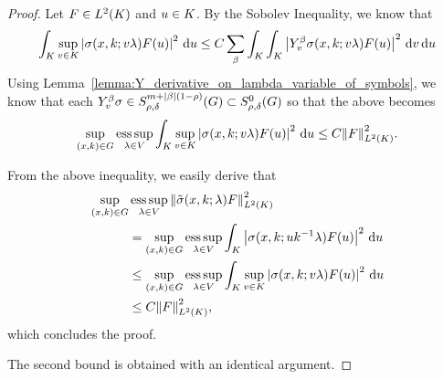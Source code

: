 \begin{proof}
    Let $F \in \Lebesgue 2 \CompactGroup$ and $u \in \CompactGroup$.
    By the Sobolev Inequality,
    we know that
    \begin{align*}
        \int_\CompactGroup \sup_{v \in \CompactGroup} \abs {\sigma(x, k; v \lambda) F(u)}^2 \dd u
        \leq C \sum_{\beta} \int_\CompactGroup \int_\CompactGroup \abs{Y^\beta_v \sigma(x, k; v \lambda) F(u)}^2 \dd v \dd u
    \end{align*}
    Using Lemma~\ref{lemma:Y_derivative_on_lambda_variable_of_symbols},
    we know that each $Y^\beta_v \sigma \in \SymbolClass {m + \abs \beta (1 - \rho)} {\rho, \delta} \subset \SymbolClass 0 {\rho, \delta}$ so that the above becomes
    \begin{align*}
        \sup_{(x, k) \in \Group} \esssup_{\lambda \in \VectorSpace}
        \int_\CompactGroup \sup_{v \in \CompactGroup} \abs {\sigma(x, k; v \lambda) F(u)}^2 \dd u
        \leq C \norm [\Lebesgue 2 \CompactGroup] {F}^2.
    \end{align*}

    From the above inequality, we easily derive that
    \begin{align*}
        \sup_{(x, k) \in \Group}& \esssup_{\lambda \in \VectorSpace} \norm [\Lebesgue 2 \CompactGroup] {\tilde \sigma(x, k; \lambda) F}^2\\
        &= \sup_{(x, k) \in \Group} \esssup_{\lambda \in \VectorSpace} \int_\CompactGroup \abs {\sigma(x, k; u k^{-1} \lambda) F(u)}^2 \dd u\\
        &\leq \sup_{(x, k) \in \Group} \esssup_{\lambda \in \VectorSpace} \int_\CompactGroup \sup_{v \in \CompactGroup} \abs {\sigma(x, k; v \lambda) F(u)}^2 \dd u\\
        &\leq C \norm [\Lebesgue 2 \CompactGroup] {F}^2,
    \end{align*}
    which concludes the proof.

    The second bound is obtained with an identical argument.
\end{proof}

